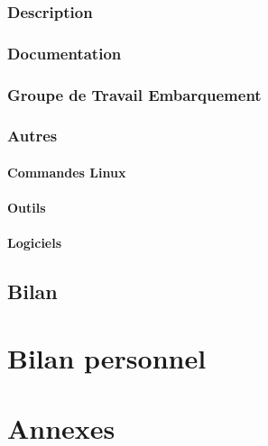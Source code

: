 \documentclass[12pt]{article}
\begin{document}
\subsubsection{Description}
\subsubsection{Documentation}
\subsubsection{Groupe de Travail Embarquement}

\newpage
\subsubsection{Autres}
\paragraph{Commandes Linux}

\paragraph{Outils}

\paragraph{Logiciels}


\newpage
\subsection{Bilan}

\newpage
\section{Bilan personnel}


\newpage
\section{Annexes}
\end{document}
